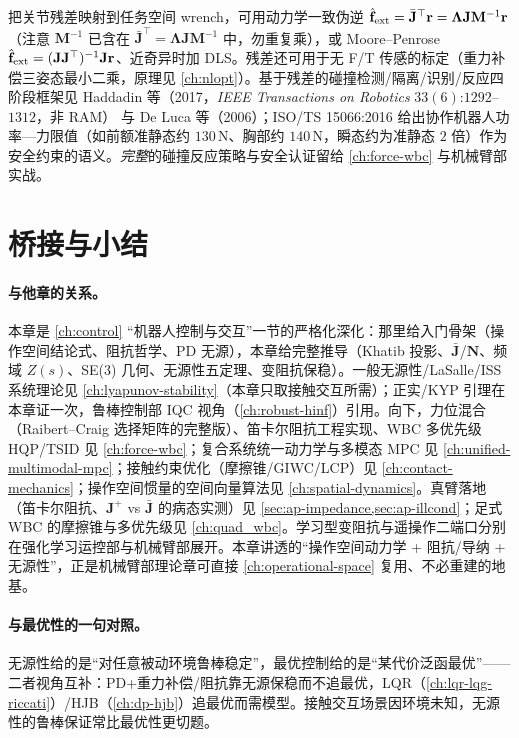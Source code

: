 把关节残差映射到任务空间 wrench，可用动力学一致伪逆 $\hat{\mathbf f}_{\rm ext}=\bar{\mathbf J}^\top\mathbf r=\boldsymbol\Lambda\mathbf J\mathbf M^{-1}\mathbf r$（注意 $\mathbf M^{-1}$ 已含在 $\bar{\mathbf J}^\top=\boldsymbol\Lambda\mathbf J\mathbf M^{-1}$ 中，勿重复乘），或 Moore--Penrose $\hat{\mathbf f}_{\rm ext}=(\mathbf J\mathbf J^\top)^{-1}\mathbf J\mathbf r$、近奇异时加 DLS。残差还可用于无 F/T 传感的标定（重力补偿三姿态最小二乘，原理见 \cref{ch:nlopt}）。基于残差的碰撞检测/隔离/识别/反应四阶段框架见 Haddadin 等（2017，\emph{IEEE Transactions on Robotics} $33(6)$:$1292$--$1312$，非 RAM）\cite{haddadin2017collision} 与 De Luca 等（2006）\cite{deluca2006collision}；ISO/TS 15066:2016 给出协作机器人功率—力限值（如前额准静态约 $130\,$N、胸部约 $140\,$N，瞬态约为准静态 $2$ 倍）作为安全约束的语义。\emph{完整}的碰撞反应策略与安全认证留给 \cref{ch:force-wbc} 与机械臂部实战。

\section{桥接与小结}
\label{sec:os-bridge}

\paragraph{与他章的关系。}
本章是 \cref{ch:control} “机器人控制与交互”一节的严格化深化：那里给入门骨架（操作空间结论式、阻抗哲学、PD 无源），本章给完整推导（Khatib 投影、$\bar{\mathbf J}$/$\mathbf N$、频域 $Z(s)$、SE(3) 几何、无源性五定理、变阻抗保稳）。一般无源性/LaSalle/ISS 系统理论见 \cref{ch:lyapunov-stability}（本章只取接触交互所需）；正实/KYP 引理在本章证一次，鲁棒控制部 IQC 视角（\cref{ch:robust-hinf}）引用。向下，力位混合（Raibert--Craig 选择矩阵的完整版）、笛卡尔阻抗工程实现、WBC 多优先级 HQP/TSID 见 \cref{ch:force-wbc}；复合系统统一动力学与多模态 MPC 见 \cref{ch:unified-multimodal-mpc}；接触约束优化（摩擦锥/GIWC/LCP）见 \cref{ch:contact-mechanics}；操作空间惯量的空间向量算法见 \cref{ch:spatial-dynamics}。真臂落地（笛卡尔阻抗、$\mathbf J^+$ vs $\bar{\mathbf J}$ 的病态实测）见 \cref{sec:ap-impedance,sec:ap-illcond}；足式 WBC 的摩擦锥与多优先级见 \cref{ch:quad_wbc}。学习型变阻抗与遥操作二端口分别在强化学习运控部与机械臂部展开。本章讲透的“操作空间动力学 + 阻抗/导纳 + 无源性”，正是机械臂部理论章可直接 \cref{ch:operational-space} 复用、不必重建的地基。

\paragraph{与最优性的一句对照。}
无源性给的是“对任意被动环境鲁棒稳定”，最优控制给的是“某代价泛函最优”——二者视角互补：PD+重力补偿/阻抗靠无源保稳而不追最优，LQR（\cref{ch:lqr-lqg-riccati}）/HJB（\cref{ch:dp-hjb}）追最优而需模型。接触交互场景因环境未知，无源性的鲁棒保证常比最优性更切题。

